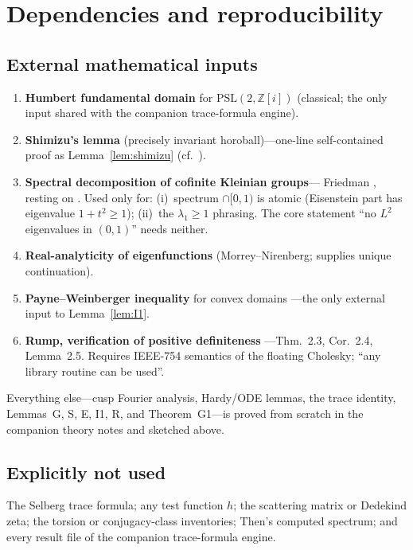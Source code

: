 \documentclass[11pt]{amsart}
\newcommand{\ZZ}{\mathbb{Z}}
\newcommand{\PSL}{\mathrm{PSL}}
\begin{document}
\section{Dependencies and reproducibility}\label{sec:deps}

\subsection{External mathematical inputs}

\begin{enumerate}
\item \textbf{Humbert fundamental domain} for $\PSL(2,\ZZ[i])$
  (classical; the only input shared with the companion
  trace-formula engine).
\item \textbf{Shimizu's lemma} (precisely invariant horoball)---one-line
  self-contained proof as Lemma~\ref{lem:shimizu}
  (cf.\ \cite{Shimizu63,Leutbecher67}).
\item \textbf{Spectral decomposition of cofinite Kleinian groups}---
  Friedman \cite[Thm.~3.8.1]{Friedman}, resting on
  \cite[§6.2]{EGM98}.  Used only for: (i)~spectrum $\cap[0,1)$ is atomic
  (Eisenstein part has eigenvalue $1+t^2\ge 1$); (ii)~the $\lambda_1\ge 1$
  phrasing.  The core statement ``no $L^2$ eigenvalues in $(0,1)$'' needs
  neither.
\item \textbf{Real-analyticity of eigenfunctions} (Morrey--Nirenberg;
  supplies unique continuation).
\item \textbf{Payne--Weinberger inequality} for convex domains
  \cite{PW60,Bebendorf03}---the only external input to Lemma~\ref{lem:I1}.
\item \textbf{Rump, verification of positive definiteness}
  \cite{Rump06}---Thm.~2.3, Cor.~2.4, Lemma~2.5.  Requires IEEE-754
  semantics of the floating Cholesky; ``any library routine can be used''.
\end{enumerate}

Everything else---cusp Fourier analysis, Hardy/ODE lemmas, the trace
identity, Lemmas~G, S, E, I1, R, and Theorem~G1---is proved from scratch
in the companion theory notes and sketched above.

\subsection{Explicitly not used}

The Selberg trace formula; any test function $h$; the scattering matrix
or Dedekind zeta; the torsion or conjugacy-class inventories; Then's
computed spectrum; and every result file of the companion trace-formula
engine.
\end{document}

